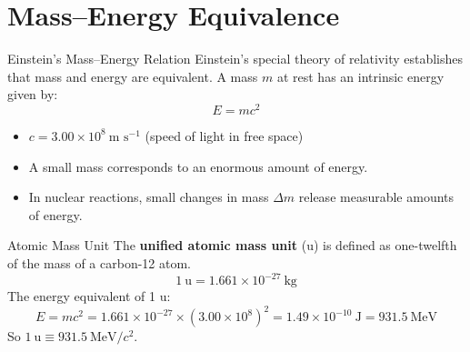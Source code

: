 

\section{Mass--Energy Equivalence}

\begin{definitionbox}{Einstein's Mass--Energy Relation}
Einstein's special theory of relativity establishes that mass and energy are equivalent. A mass $m$ at rest has an intrinsic energy given by:
$$E = mc^2$$
\begin{itemize}[itemsep=2pt]
  \item $c = 3.00 \times 10^8\ \text{m s}^{-1}$ (speed of light in free space)
  \item A small mass corresponds to an enormous amount of energy.
  \item In nuclear reactions, small changes in mass $\Delta m$ release measurable amounts of energy.
\end{itemize}
\end{definitionbox}

\begin{definitionbox}{Atomic Mass Unit}
The \textbf{unified atomic mass unit} (u) is defined as one-twelfth of the mass of a carbon-12 atom.
$$1\ \text{u} = 1.661 \times 10^{-27}\ \text{kg}$$
The energy equivalent of 1 u:
$$E = mc^2 = 1.661\times10^{-27} \times (3.00\times10^8)^2 = 1.49\times10^{-10}\ \text{J} = 931.5\ \text{MeV}$$
So $1\ \text{u} \equiv 931.5\ \text{MeV}/c^2$.
\end{definitionbox}

